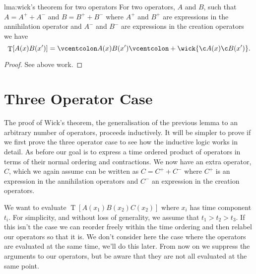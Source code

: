 \documentclass[fleqn]{NotesClass}
\newcommand{\normalordering}[1]{\mathopen{\vcentcolon}{#1}\mathclose{\vcentcolon}}
\DeclareMathOperator{\timeOrdering}{T}
\begin{document}
    \begin{lma}{}{lma:wick's theorem for two operators}
        For two operators, \(A\) and \(B\), such that \(A = A^+ + A^-\) and \(B = B^+ + B^-\) where \(A^+\) and \(B^+\) are expressions in the annihilation operator and \(A^-\) and \(B^-\) are expressions in the creation operators we have
        \begin{equation}
            \timeOrdering[A(x)B(x')] = \normalordering{A(x)B(x')} + \wick{\c A(x) \c B(x')}.
        \end{equation}
        \begin{proof}
            See above work.
        \end{proof}
    \end{lma}
    
    \section{Three Operator Case}
    The proof of Wick's theorem, the generalisation of the previous lemma to an arbitrary number of operators, proceeds inductively.
    It will be simpler to prove if we first prove the three operator case to see how the inductive logic works in detail.
    As before our goal is to express a time ordered product of operators in terms of their normal ordering and contractions.
    We now have an extra operator, \(C\), which we again assume can be written as \(C = C^+ + C^-\) where \(C^+\) is an expression in the annihilation operators and \(C^-\) an expression in the creation operators.
    
    We want to evaluate \(\timeOrdering[A(x_1)B(x_2)C(x_2)]\) where \(x_i\) has time component \(t_i\).
    For simplicity, and without loss of generality, we assume that \(t_1 > t_2 > t_3\).
    If this isn't the case we can reorder freely within the time ordering and then relabel our operators so that it is.
    We don't consider here the case where the operators are evaluated at the same time, we'll do this later.
    From now on we suppress the arguments to our operators, but be aware that they are not all evaluated at the same point.
    
\end{document}
